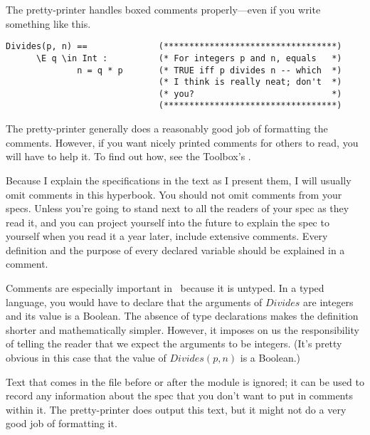 The pretty-printer handles boxed comments properly---even if
you write something like 
this.
\begin{widedisplay}
\begin{verbatim}
Divides(p, n) ==              (**********************************)
      \E q \in Int :          (* For integers p and n, equals   *)
              n = q * p       (* TRUE iff p divides n -- which  *)
                              (* I think is really neat; don't  *)
                              (* you?                           *)
                              (**********************************)
\end{verbatim}
\end{widedisplay}
The pretty-printer generally does a reasonably good job of formatting
the comments.  However, if you want nicely
printed comments for others to
read, you will have to help it.  To find out how, see the Toolbox's
.

Because I explain the specifications in the text as I present them, I
will usually omit comments in this hyperbook.  You should not omit
comments from your specs.  Unless you're going to stand next to all
the readers of your spec as they read it, and you can project yourself
into the future to explain the spec to yourself when you read it a
year later, include extensive comments.  Every definition and the
purpose of every declared variable should be explained in a comment.

Comments are especially important in \tlaplus\ because it is untyped.
In a typed language, you would have to declare that the arguments of
$Divides$ are integers and its value is a Boolean.  The absence of
type declarations makes the definition shorter and mathematically
simpler.  However, it imposes on us the responsibility%
of telling the reader that we expect the arguments to be integers.
(It's pretty obvious in this case that the value of
$Divides(p,n)$ is a Boolean.)

Text that comes in the file before or after the module is ignored; it
can be used to record any information about the spec that you don't
want to put in comments within it.  The pretty-printer does output
this text, but it might not do a very good job of formatting it.

